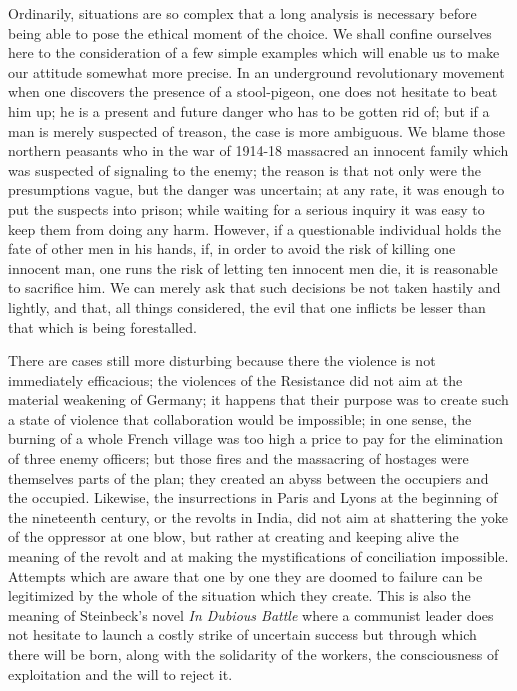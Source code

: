 \documentclass[11pt]{article}
\begin{document}
{{Ordinarily, situations are so complex that a long analysis is necessary before being able to pose the ethical moment of the choice. We shall confine ourselves here to the consideration of a few simple examples which will enable us to make our attitude somewhat more precise. In an underground revolutionary movement when one discovers the presence of a stool-pigeon, one does not hesitate to beat him up; he is a present and future danger who has to be gotten rid of; but if a man is merely suspected of treason, the case is more ambiguous. We blame those northern peasants who in the war of 1914-18 massacred an innocent family which was suspected of signaling to the enemy; the reason is that not only were the presumptions vague, but the danger was uncertain; at any rate, it was enough to put the suspects into prison; while waiting for a serious inquiry it was easy to keep them from doing any harm. However, if a questionable individual holds the fate of other men in his hands, if, in order to avoid the risk of killing one innocent man, one runs the risk of letting ten innocent men die, it is reasonable to sacrifice him. We can merely ask that such decisions be not taken hastily and lightly, and that, all things considered, the evil that one inflicts be lesser than that which is being forestalled.

There are cases still more disturbing because there the violence is not immediately efficacious; the violences of the Resistance did not aim at the material weakening of Germany; it happens that their purpose was to create such a state of violence that collaboration would be impossible; in one sense, the burning of a whole French village was too high a price to pay for the elimination of three enemy officers; but those fires and the massacring of hostages were themselves parts of the plan; they created an abyss between the occupiers and the occupied. Likewise, the insurrections in Paris and Lyons at the beginning of the nineteenth century, or the revolts in India, did not aim at shattering the yoke of the oppressor at one blow, but rather at creating and keeping alive the meaning of the revolt and at making the mystifications of conciliation impossible. Attempts which are aware that one by one they are doomed to failure can be legitimized by the whole of the situation which they create. This is also the meaning of Steinbeck’s novel \textit{In Dubious Battle} where a communist leader does not hesitate to launch a costly strike of uncertain success but through which there will be born, along with the solidarity of the workers, the consciousness of exploitation and the will to reject it.

}}
\end{document}
